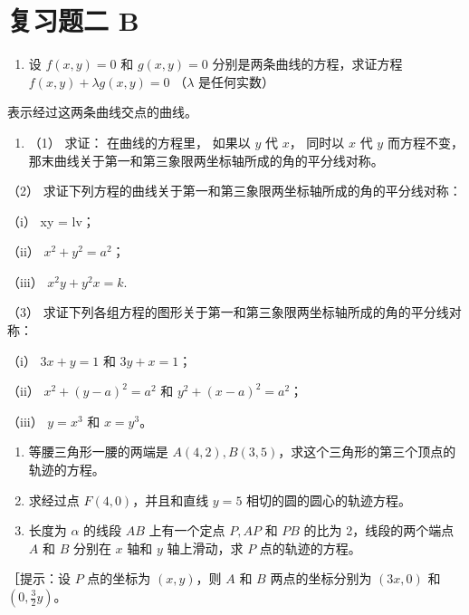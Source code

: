 \section{复习题二 B}\label{ux590dux4e60ux9898ux4e8c-b}

\begin{enumerate}
\def\labelenumi{\arabic{enumi}.}
\tightlist
\item
  设 \(f(x, y) = 0\) 和 \(g(x, y) = 0\) 分别是两条曲线的方程，求证方程
  \(f(x, y) + \lambda g(x, y) = 0\) （\(\lambda\) 是任何实数）
\end{enumerate}

表示经过这两条曲线交点的曲线。

\begin{enumerate}
\def\labelenumi{\arabic{enumi}.}
\setcounter{enumi}{1}
\tightlist
\item
  （1） 求证： 在曲线的方程里， 如果以 \(y\) 代 \(x\)， 同时以 \(x\) 代
  \(y\) 而方程不变，
  那末曲线关于第一和第三象限两坐标轴所成的角的平分线对称。
\end{enumerate}

（2） 求证下列方程的曲线关于第一和第三象限两坐标轴所成的角的平分线对称：

（i） xy = lv；

（ii） \(x^{2} + y^{2} = a^{2}\)；

（iii） \(x^{2}y + y^{2}x = k.\)

（3）
求证下列各组方程的图形关于第一和第三象限两坐标轴所成的角的平分线对称：

（i） \(3x + y = 1\) 和 \(3y + x = 1\)；

（ii） \(x^{2} + (y - a)^{2} = a^{2}\) 和
\(y^{2} + (x - a)^{2} = a^{2}\)；

（iii） \(y = x^3\) 和 \(x = y^3\)。

\begin{enumerate}
\def\labelenumi{\arabic{enumi}.}
\setcounter{enumi}{2}
\item
  等腰三角形一腰的两端是
  \(A(4, 2), B(3, 5)\)，求这个三角形的第三个顶点的轨迹的方程。
\item
  求经过点 \(F(4,0)\)，并且和直线 \(y = 5\) 相切的圆的圆心的轨迹方程。
\item
  长度为 \(\alpha\) 的线段 \(AB\) 上有一个定点 \(P, AP\) 和 \(PB\)
  的比为 2，线段的两个端点 \(A\) 和 \(B\) 分别在 \(x\) 轴和 \(y\)
  轴上滑动，求 \(P\) 点的轨迹的方程。
\end{enumerate}

［提示：设 \(P\) 点的坐标为 \((x, y)\)，则 \(A\) 和 \(B\)
两点的坐标分别为 \((3x, 0)\) 和 \(\left(0, \frac{3}{2} y\right)\)。

